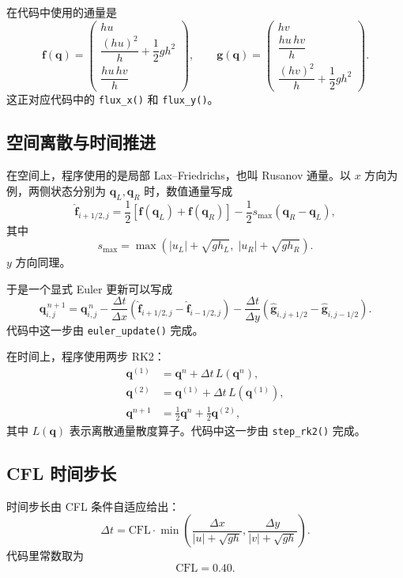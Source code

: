 \documentclass[12pt,a4paper]{article}
\begin{document}
在代码中使用的通量是
\[
\mathbf{f}(\mathbf{q}) =
\begin{pmatrix}
hu \\
\dfrac{(hu)^2}{h} + \dfrac{1}{2}gh^2 \\
\dfrac{hu\,hv}{h}
\end{pmatrix},
\qquad
\mathbf{g}(\mathbf{q}) =
\begin{pmatrix}
hv \\
\dfrac{hu\,hv}{h} \\
\dfrac{(hv)^2}{h} + \dfrac{1}{2}gh^2
\end{pmatrix}.
\]
这正对应代码中的 \texttt{flux\_x()} 和 \texttt{flux\_y()}。

\subsection{空间离散与时间推进}

在空间上，程序使用的是局部 Lax--Friedrichs，也叫 Rusanov 通量。以 $x$ 方向为例，两侧状态分别为 $\mathbf{q}_L,\mathbf{q}_R$ 时，数值通量写成
\[
\widehat{\mathbf{f}}_{i+1/2,j}
= \frac{1}{2}\left[\mathbf{f}(\mathbf{q}_L)+\mathbf{f}(\mathbf{q}_R)\right]
- \frac{1}{2}s_{\max}\left(\mathbf{q}_R-\mathbf{q}_L\right),
\]
其中
\[
s_{\max} = \max\left(|u_L|+\sqrt{gh_L},\; |u_R|+\sqrt{gh_R}\right).
\]
$y$ 方向同理。

于是一个显式 Euler 更新可以写成
\[
\mathbf{q}_{i,j}^{\,n+1}
= \mathbf{q}_{i,j}^{\,n}
- \frac{\Delta t}{\Delta x}\left(
\widehat{\mathbf{f}}_{i+1/2,j}-\widehat{\mathbf{f}}_{i-1/2,j}
\right)
- \frac{\Delta t}{\Delta y}\left(
\widehat{\mathbf{g}}_{i,j+1/2}-\widehat{\mathbf{g}}_{i,j-1/2}
\right).
\]
代码中这一步由 \texttt{euler\_update()} 完成。

在时间上，程序使用两步 RK2：
\begin{align*}
\mathbf{q}^{(1)} &= \mathbf{q}^n + \Delta t\, L(\mathbf{q}^n), \\
\mathbf{q}^{(2)} &= \mathbf{q}^{(1)} + \Delta t\, L(\mathbf{q}^{(1)}), \\
\mathbf{q}^{n+1} &= \frac{1}{2}\mathbf{q}^{n} + \frac{1}{2}\mathbf{q}^{(2)},
\end{align*}
其中 $L(\mathbf{q})$ 表示离散通量散度算子。代码中这一步由 \texttt{step\_rk2()} 完成。

\subsection{CFL 时间步长}

时间步长由 CFL 条件自适应给出：
\[
\Delta t
= \mathrm{CFL}\cdot
\min\left(
\frac{\Delta x}{|u|+\sqrt{gh}},
\frac{\Delta y}{|v|+\sqrt{gh}}
\right).
\]
代码里常数取为
\[
\mathrm{CFL}=0.40.
\]
\end{document}
